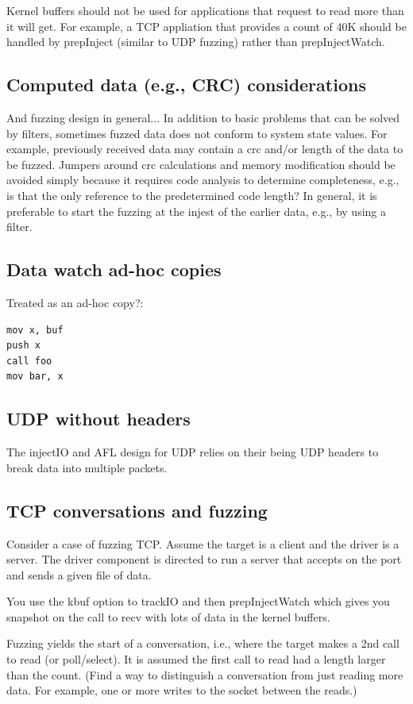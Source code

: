 \documentclass[titlepage]{article}
\begin{document}
\begin{appendices}
Kernel buffers should not be used for applications that request to read more than it will get.  For example, a TCP appliation that provides a count of 40K should be handled by
prepInject (similar to UDP fuzzing) rather than prepInjectWatch.

\subsection{Computed data (e.g., CRC) considerations}
And fuzzing design in general... In addition to basic problems that can be solved by filters, sometimes fuzzed data does not conform to system state values.
For example, previously received data may contain a crc and/or length of the data to be fuzzed.  Jumpers around crc calculations and memory modification should
be avoided simply because it requires code analysis to determine completeness, e.g., is that the only reference to the predetermined code length?  In general,
it is preferable to start the fuzzing at the injest of the earlier data, e.g., by using a filter.

\subsection{Data watch ad-hoc copies}
Treated as an ad-hoc copy?:
\begin{verbatim}
mov x, buf
push x
call foo
mov bar, x
\end{verbatim}

\subsection{UDP without headers}
The injectIO and AFL design for UDP relies on their being UDP headers to break data into multiple packets.

\subsection{TCP conversations and fuzzing}
Consider a case of fuzzing TCP.  Assume the target is a client and the driver is a server.
The driver component is directed to run a server that accepts on the port and sends a given file of data.

You use the kbuf option to trackIO and then prepInjectWatch which gives you snapshot on the
call to recv with lots of data in the kernel buffers.

Fuzzing yields the start of a conversation, i.e., where the target makes a 2nd call to read (or poll/select).  It
is assumed the first call to read had a length larger than the count.  (Find a way to distinguish a conversation from
just reading more data.  For example, one or more writes to the socket between the reads.)


\end{appendices}
\end{document}
